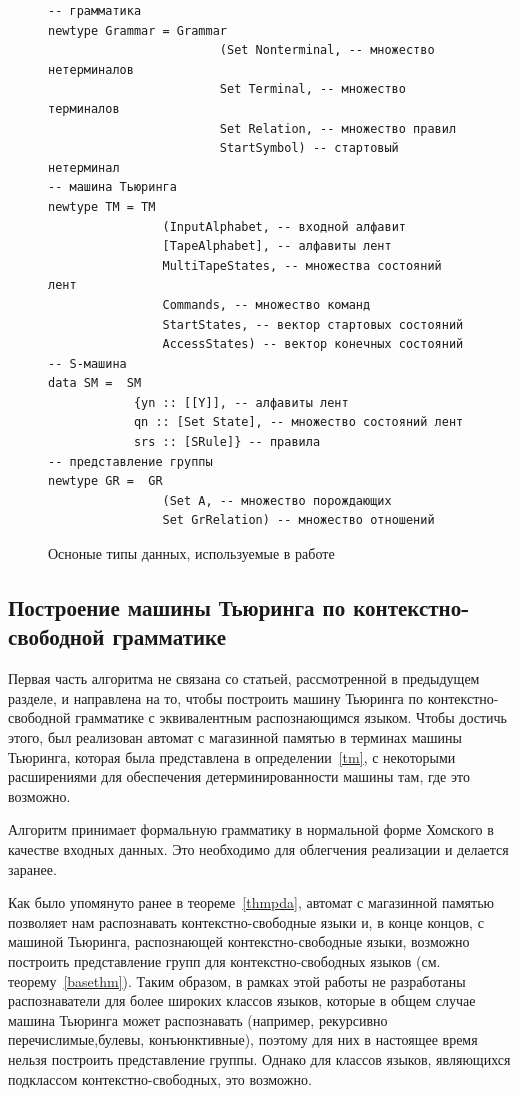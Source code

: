 \documentclass[14pt]{matmex-diploma-custom}
\begin{document}
\begin{figure}[H]
\begin{verbatim}
-- грамматика
newtype Grammar = Grammar 
                        (Set Nonterminal, -- множество нетерминалов
                        Set Terminal, -- множество терминалов
                        Set Relation, -- множество правил
                        StartSymbol) -- стартовый нетерминал
-- машина Тьюринга                        
newtype TM = TM 
                (InputAlphabet, -- входной алфавит
                [TapeAlphabet], -- алфавиты лент
                MultiTapeStates, -- множества состояний лент
                Commands, -- множество команд
                StartStates, -- вектор стартовых состояний
                AccessStates) -- вектор конечных состояний
-- S-машина                
data SM =  SM 
            {yn :: [[Y]], -- алфавиты лент
            qn :: [Set State], -- множество состояний лент
            srs :: [SRule]} -- правила
-- представление группы        
newtype GR =  GR 
                (Set A, -- множество порождающих
                Set GrRelation) -- множество отношений
\end{verbatim}
\caption{Осноные типы данных, используемые в работе}
\label{fig:types}
\end{figure}

\subsection{Построение машины Тьюринга по контекстно-свободной грамматике}
Первая часть алгоритма не связана со статьей, рассмотренной в предыдущем разделе, 
и направлена на то, чтобы построить машину Тьюринга по контекстно-свободной грамматике 
с эквивалентным распознающимся языком.
Чтобы достичь этого, был реализован автомат с магазинной памятью в терминах машины Тьюринга, 
которая была представлена в определении~\ref{tm}, с некоторыми 
расширениями для обеспечения детерминированности машины там, где это возможно.

Алгоритм принимает формальную грамматику в нормальной форме Хомского в качестве входных данных.
Это необходимо для облегчения реализации и делается заранее.

Как было упомянуто ранее в теореме~\ref{thmpda}, автомат с магазинной памятью позволяет нам распознавать контекстно-свободные языки и, в конце концов, с машиной Тьюринга, распознающей контекстно-свободные языки, возможно построить представление групп для контекстно-свободных языков
(см. теорему~\ref{basethm}). 
Таким образом, в рамках этой работы не разработаны распознаватели для более 
широких классов языков, которые в общем случае машина Тьюринга может распознавать 
(например, рекурсивно перечислимые,булевы, конъюнктивные), поэтому для них в настоящее время нельзя 
построить представление группы. Однако для классов языков, являющихся подклассом 
контекстно-свободных, это возможно. 
\end{document}
